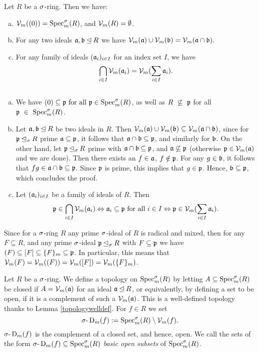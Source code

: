 \begin{lem}\label{topologywelldef}
Let $R$ be a $\sigma$-ring. Then we have:
\begin{enumerate}[(a)]
\item $\mathcal{V}_m((0)) = \operatorname{Spec}^\sigma_m(R)$, and $\mathcal{V}_m(R) = \emptyset$.
\item For any two ideals $\mathfrak{a},\mathfrak{b} \unlhd R$ we have $\mathcal{V}_m(\mathfrak{a}) \cup \mathcal{V}_m(\mathfrak{b}) = \mathcal{V}_m(\mathfrak{a} \cap \mathfrak{b}).$
\item For any family of ideals $(\mathfrak{a}_i)_{i \in I}$ for an index set $I$, we have $$\bigcap_{i \in I} \mathcal{V}_m(\mathfrak{a}_i) = \mathcal{V}_m(\sum_{i \in I} \mathfrak{a}_i).$$ \label{vmintersectionideals}
\end{enumerate}
\begin{bew} $~$
\begin{enumerate}[(a)]
\item We have $(0) \subseteq \mathfrak{p} \text{ for all } \mathfrak{p} \in \operatorname{Spec}^\sigma_m(R)$, as well as $R~\not\subseteq~\mathfrak{p} $ for all $\mathfrak{p}~\in~\operatorname{Spec}^\sigma_m(R)$.
\item Let $\mathfrak{a}, \mathfrak{b} \unlhd R$ be two ideals in $R$. Then $\mathcal{V}_m(\mathfrak{a}) \cup \mathcal{V}_m(\mathfrak{b}) \subseteq \mathcal{V}_m(\mathfrak{a} \cap \mathfrak{b})$, since for $\mathfrak{p} \unlhd_{\sigma} R$ prime $\mathfrak{a} \subseteq \mathfrak{p}$, it follows that $\mathfrak{a} \cap \mathfrak{b} \subseteq \mathfrak{p}$, and similarly for $\mathfrak{b}$.
On the other hand, let $\mathfrak{p} \unlhd_{\sigma} R$ prime with $\mathfrak{a} \cap \mathfrak{b} \subseteq \mathfrak{p}$, and $\mathfrak{a} \not\subseteq \mathfrak{p}$ (otherwise $\mathfrak{p} \in \mathcal{V}_m(\mathfrak{a})$ and we are done). Then there exists an $f \in \mathfrak{a}$, $f \notin \mathfrak{p}$. 
For any $g \in \mathfrak{b}$, it follows that $fg \in \mathfrak{a} \cap \mathfrak{b} \subseteq \mathfrak{p}$. Since $\mathfrak{p}$ is prime, this implies that $g \in \mathfrak{p}$. Hence, $\mathfrak{b} \subseteq \mathfrak{p}$, which concludes the proof.
\item Let $(\mathfrak{a}_i)_{i \in I}$ be a family  of ideals of $R$. Then $$\mathfrak{p} \in \bigcap_{i \in I} \mathcal{V}_m(\mathfrak{a}_i) \Leftrightarrow \mathfrak{a}_i \subseteq \mathfrak{p} \text{ for all } i \in I \Leftrightarrow \mathfrak{p} \in \mathcal{V}_m(\sum_{i \in I} \mathfrak{a}_i).$$
\end{enumerate}
\end{bew}
\end{lem}


\begin{rem}\label{vmsequal}
Since for a $\sigma$-ring $R$ any prime $\sigma$-ideal of $R$ is radical and mixed, then for any $F \subseteq R$, and any prime $\sigma$-ideal $\mathfrak{p} \unlhd_{\sigma} R$ with $F \subseteq \mathfrak{p}$ we have
$(F) \subseteq [F] \subseteq \{ F \}_m \subseteq \mathfrak{p}$. In particular, this means that $\mathcal{V}_m(F) = \mathcal{V}_m((F)) = \mathcal{V}_m([F]) = \mathcal{V}_m(\{F\}_m)$. 
\end{rem}

\begin{defn}\label{deftop}
Let $R$ be a $\sigma$-ring. We define a topology on $\operatorname{Spec}^\sigma_m(R)$ by letting $A \subseteq \operatorname{Spec}^\sigma_m(R)$ be closed if $A = \mathcal{V}_m(\mathfrak{a})$ for an ideal $\mathfrak{a} \unlhd R$, or equivalently,
 by defining a set to be open, if it is a complement of such a $\mathcal{V}_m(\mathfrak{a})$. This is a well-defined topology thanks to Lemma \ref{topologywelldef}.
For $f \in R$ we set $$\sigma\text{-}\operatorname{D}_m(f):= \operatorname{Spec}^\sigma_m(R) \setminus \mathcal{V}_m(f).$$ $\sigma\text{-}\operatorname{D}_m(f)$ is the complement of a closed set, and hence, open. 
We call the sets of the form $\sigma\text{-}\operatorname{D}_m(f) \subseteq \operatorname{Spec}^\sigma_m(R)$ \emph{basic open subsets} of $\operatorname{Spec}^\sigma_m(R)$. 
\end{defn}

